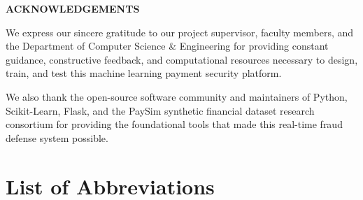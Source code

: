 \newpage
\thispagestyle{plain}
\begin{center}
    {\LARGE \bfseries \color{primaryblue} ACKNOWLEDGEMENTS}\\[1.0cm]
\end{center}

We express our sincere gratitude to our project supervisor, faculty members, and the Department of Computer Science \& Engineering for providing constant guidance, constructive feedback, and computational resources necessary to design, train, and test this machine learning payment security platform.

We also thank the open-source software community and maintainers of Python, Scikit-Learn, Flask, and the PaySim synthetic financial dataset research consortium for providing the foundational tools that made this real-time fraud defense system possible.

\newpage
\thispagestyle{plain}
\tableofcontents

\newpage
\thispagestyle{plain}
\listoffigures

\newpage
\thispagestyle{plain}
\listoftables

\newpage
\thispagestyle{plain}
\chapter*{List of Abbreviations}

